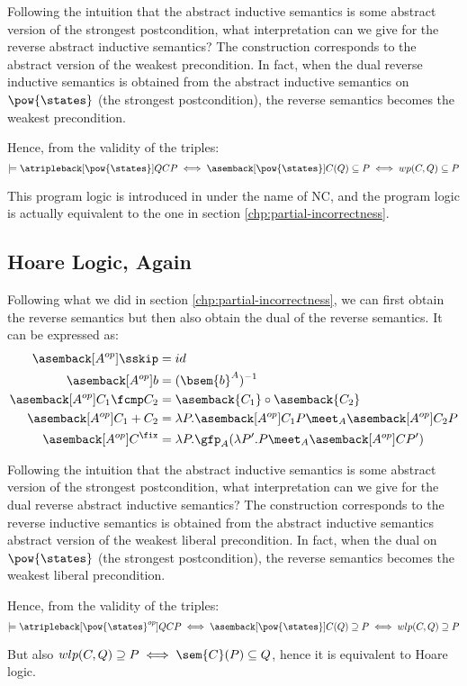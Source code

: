 Following the intuition that the abstract inductive semantics is some abstract
version of the strongest postcondition, what interpretation can we give for the
reverse abstract inductive semantics? The construction corresponds to the
abstract version of the weakest precondition. In fact, when the dual reverse
inductive semantics is obtained from the abstract inductive semantics on
$\pow{\states}$ (the strongest postcondition), the reverse semantics becomes
the weakest precondition.

Hence, from the validity of the triples: $$\models
\atripleback[\pow{\states}]{Q}{C}{P} \iff \asemback[\pow{\states}]{C}(Q)
\subseteq P \iff wp(C, Q) \subseteq P$$

This program logic is introduced in \cite{Ascari24} under the name of NC, and
the program logic is actually equivalent to the one in section
\ref{chp:partial-incorrectness}.

\subsection{Hoare Logic, Again}
Following what we did in section \ref{chp:partial-incorrectness}, we can first
obtain the reverse semantics but then also obtain the dual of the reverse
semantics. It can be expressed as: 
\begin{align*}
  \asemback[A^{op}]{\sskip}        &= id \\
  \asemback[A^{op}]{b}             &= (\bsem{b}^A)^{-1} \\
  \asemback[A^{op}]{C_1 \fcmp C_2} &= \asemback{C_1} \circ \asemback{C_2} \\
  \asemback[A^{op}]{C_1 + C_2}     &= \lambda P . \asemback[A^{op}]{C_1} P \meet_A \asemback[A^{op}]{C_2} P \\
  \asemback[A^{op}]{C^\fix}        &= \lambda P . \gfp_A(\lambda P'. P \meet_A \asemback[A^{op}]{C} P')
\end{align*}

Following the intuition that the abstract inductive semantics is some abstract
version of the strongest postcondition, what interpretation can we give for the
dual reverse abstract inductive semantics? The construction corresponds to the
reverse inductive semantics is obtained from the abstract inductive semantics
abstract version of the weakest liberal precondition. In fact, when the dual
on $\pow{\states}$ (the strongest postcondition), the reverse semantics becomes
the weakest liberal precondition.

Hence, from the validity of the triples:
$$\models \atripleback[\pow{\states}^{op}]{Q}{C}{P} \iff
\asemback[\pow{\states}]{C}(Q) \supseteq P \iff wlp(C, Q) \supseteq P$$

But also $wlp(C, Q) \supseteq P \iff \sem{C}(P) \subseteq Q$, hence it is
equivalent to Hoare logic.

